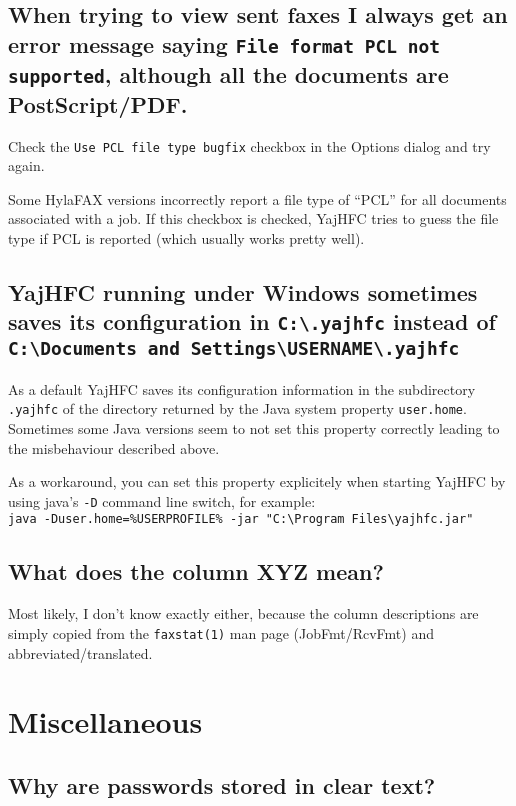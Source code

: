 \documentclass[a4paper,10pt]{scrartcl}
\begin{document}
\subsection{When trying to view sent faxes I always get an error message saying 
   \texttt{File format PCL not supported}, although all the documents are PostScript/PDF.}

Check the \texttt{Use PCL file type bugfix} checkbox in the Options dialog and try again.

Some HylaFAX versions incorrectly report a file type of ``PCL'' for all documents
associated with a job. If this checkbox is checked, YajHFC tries to guess the
file type if PCL is reported (which usually works pretty well).

\subsection{YajHFC running under Windows sometimes saves its configuration in \texttt{C:\textbackslash .yajhfc} instead of \texttt{C:\textbackslash Documents and Settings\textbackslash USERNAME\textbackslash .yajhfc}}

As a default YajHFC saves its configuration information in the subdirectory \texttt{.yajhfc} of the directory returned by
the Java system property \texttt{user.home}.
Sometimes some Java versions seem to not set this property correctly leading to the misbehaviour described above.

As a workaround, you can set this property explicitely when starting YajHFC by using java's \texttt{-D} command line switch, for example: \\
\texttt{java -Duser.home=\%USERPROFILE\% -jar "C:\textbackslash Program Files\textbackslash yajhfc.jar"}

\subsection{What does the column XYZ mean?}

Most likely, I don't know exactly either, because the column descriptions
are simply copied from the \verb.faxstat(1). man page (JobFmt/RcvFmt) and 
abbreviated/translated.

\section{Miscellaneous}

\subsection{Why are passwords stored in clear text?}
\end{document}
